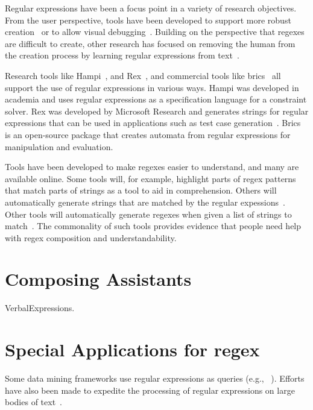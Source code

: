 Regular expressions have been a focus point in a variety of research objectives. From the user perspective, tools have been developed to support more robust creation~\cite{Spishak:2012:TSR:2318202.2318207} or to allow visual debugging~\cite{Beck:2014:RVD:2591062.2591111}.
Building on the perspective that regexes are difficult to create, other research has focused on removing the human from the creation process by learning regular expressions from  text~\cite{Babbar:2010:CBA:1871840.1871848, Li:2008:REL:1613715.1613719}.

Research tools like Hampi~\cite{hampi}, and Rex~\cite{rex}, and commercial tools like brics~\cite{brics} all support the use of regular expressions in various ways. Hampi was developed  in academia and uses regular expressions as a specification language for a constraint solver. Rex was developed by Microsoft Research and generates strings for regular expressions that can be used in  applications such as test case generation~\cite{Anand:2013:OSM:2503903.2503991, Tillmann:2014:TAT:2642937.2642941}. Brics is an open-source package that creates automata from regular expressions for manipulation and evaluation.


Tools have been developed to make regexes easier to understand, and many are available online.
Some tools will, for example, highlight parts of regex patterns that match parts of strings as a tool to aid in comprehension.
Others will automatically generate strings that are matched by the regular expessions~\cite{hampi}.
Other tools will automatically generate regexes when given a list of strings to match~\cite{Babbar:2010:CBA:1871840.1871848, Li:2008:REL:1613715.1613719}.
The commonality of such tools provides evidence that people need help with regex composition and understandability.

\section{Composing Assistants}
VerbalExpressions.


\section{Special Applications for regex}

Some data mining frameworks use regular expressions as queries (e.g., ~\cite{Begel:2010:CDE:1806799.1806821}). Efforts have also been made to expedite the processing of regular expressions on large bodies of text~\cite{Baeza-Yates:1996:FTS:235809.235810}.


